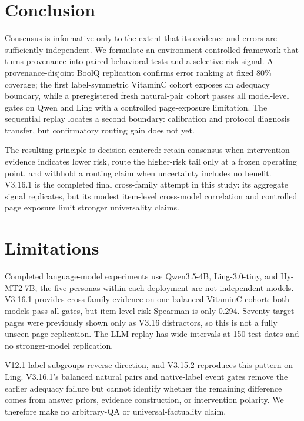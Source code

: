 \documentclass[11pt]{article}
\begin{document}
\section{Conclusion}

Consensus is informative only to the extent that its evidence and errors are sufficiently independent. We formulate an environment-controlled framework that turns provenance into paired behavioral tests and a selective risk signal. A provenance-disjoint BoolQ replication confirms error ranking at fixed 80\% coverage; the first label-symmetric VitaminC cohort exposes an adequacy boundary, while a preregistered fresh natural-pair cohort passes all model-level gates on Qwen and Ling with a controlled page-exposure limitation. The sequential replay locates a second boundary: calibration and protocol diagnosis transfer, but confirmatory routing gain does not yet.

The resulting principle is decision-centered: retain consensus when intervention evidence indicates lower risk, route the higher-risk tail only at a frozen operating point, and withhold a routing claim when uncertainty includes no benefit. V3.16.1 is the completed final cross-family attempt in this study: its aggregate signal replicates, but its modest item-level cross-model correlation and controlled page exposure limit stronger universality claims.

\section*{Limitations}

Completed language-model experiments use Qwen3.5-4B, Ling-3.0-tiny, and Hy-MT2-7B; the five personas within each deployment are not independent models. V3.16.1 provides cross-family evidence on one balanced VitaminC cohort: both models pass all gates, but item-level risk Spearman is only 0.294. Seventy target pages were previously shown only as V3.16 distractors, so this is not a fully unseen-page replication. The LLM replay has wide intervals at 150 test dates and no stronger-model replication.

V12.1 label subgroups reverse direction, and V3.15.2 reproduces this pattern on Ling. V3.16.1's balanced natural pairs and native-label event gates remove the earlier adequacy failure but cannot identify whether the remaining difference comes from answer priors, evidence construction, or intervention polarity. We therefore make no arbitrary-QA or universal-factuality claim.
\end{document}
